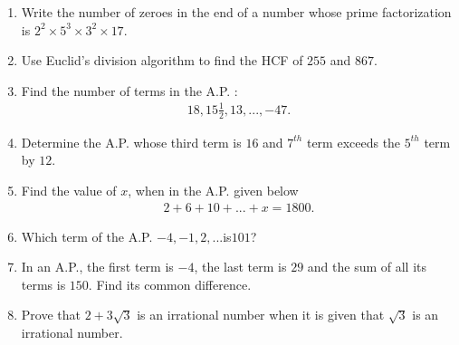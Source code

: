 \begin{enumerate}
\item Write the number of zeroes in the end of a number whose prime factorization is $2^2 \times 5^3 \times 3^2 \times 17$.

\item Use Euclid's division algorithm to find the HCF of $255$ and $867$.

\item Find the number of terms in the A.P. :
\begin{align*}
    18,15\frac{1}{2},13, ...,-47.
\end{align*}

\item Determine the A.P. whose third term is $16$ and $7^{th}$ term exceeds the $5^{th}$ term by $12$.

\item Find the value of $x$, when in the A.P. given below
\begin{align*}
2 + 6 + 10 + ... + x = 1800.    
\end{align*}

\item Which term of the A.P. $-4, - 1, 2, ... $is$ 101$?

\item In an A.P., the first term is $- 4$, the last term is $29$ and the sum of all its terms is $150$. Find its common difference.

\item Prove that $2 + 3\sqrt{3}$ is an irrational number when it is given that $\sqrt{3}$ is an irrational number.
\end{enumerate}
